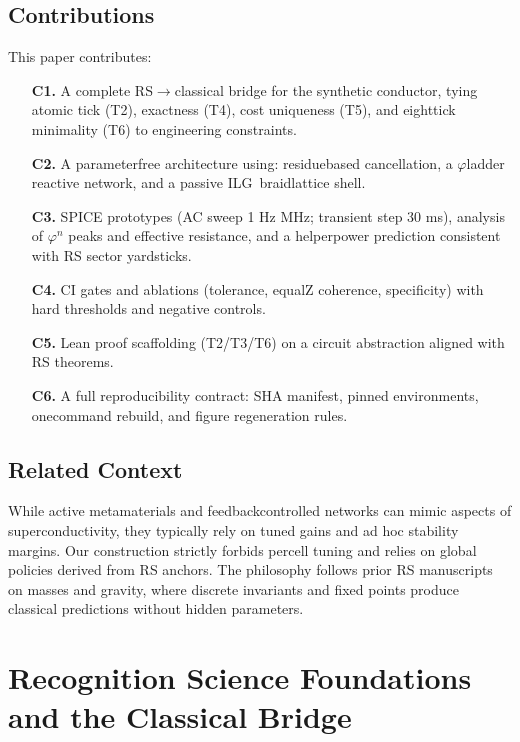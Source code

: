 \documentclass[11pt,a4paper]{article}
\newcommand{\ILG}{\textsc{ILG}}
\begin{document}
\subsection{Contributions}
This paper contributes:
\begin{enumerate}
  \item[\textbf{C1.}] A complete RS\(\to\)classical bridge for the synthetic conductor, tying atomic tick (T2), exactness (T4), cost uniqueness (T5), and eight\textendash tick minimality (T6) to engineering constraints.
  \item[\textbf{C2.}] A parameter\textendash free architecture using: residue\textendash based cancellation, a \(\varphi\)\textendash ladder reactive network, and a passive \ILG\ braid\textendash lattice shell.
  \item[\textbf{C3.}] SPICE prototypes (AC sweep 1 Hz MHz; transient step 30 ms), analysis of \(\varphi^n\) peaks and effective resistance, and a helper\textendash power prediction consistent with RS sector yardsticks.
  \item[\textbf{C4.}] CI gates and ablations (tolerance, equal\textendash Z coherence, specificity) with hard thresholds and negative controls.
  \item[\textbf{C5.}] Lean proof scaffolding (T2/T3/T6) on a circuit abstraction aligned with RS theorems.
  \item[\textbf{C6.}] A full reproducibility contract: SHA manifest, pinned environments, one\textendash command rebuild, and figure regeneration rules.
\end{enumerate}

\subsection{Related Context}
While active metamaterials and feedback\textendash controlled networks can mimic aspects of superconductivity, they typically rely on tuned gains and ad hoc stability margins. Our construction strictly forbids per\textendash cell tuning and relies on global policies derived from RS anchors. The philosophy follows prior RS manuscripts on masses and gravity, where discrete invariants and fixed points produce classical predictions without hidden parameters.

\section{Recognition Science Foundations and the Classical Bridge}
\label{sec:bridge}
\end{document}
